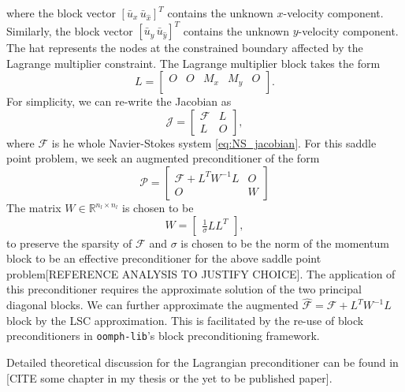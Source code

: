 \renewcommand{\arraystretch}{1}
where the block vector $[\bar{u}_x \, \bar{u}_{\hat{x}}]^T$ contains the unknown $x$-velocity component. Similarly, the block vector
$[\bar{u}_y \, \bar{u}_{\hat{y}}]^T$ contains the unknown $y$-velocity component. The hat represents the nodes at the constrained boundary affected by the Lagrange
multiplier constraint. The Lagrange multiplier block takes the form
\begin{equation*}
	L =
\begin{bmatrix}
 O & O & M_x & M_y & O \\
\end{bmatrix}.
\end{equation*}
For simplicity, we can re-write the Jacobian as
\begin{equation*}
	\mathcal{J} = 
	\begin{bmatrix}
	 \mathcal{F} & L\\
	L & \mathit{O}
	\end{bmatrix},
\end{equation*}
where $\mathcal{F}$ is he whole Navier-Stokes system \eqref{eq:NS_jacobian}.
For this saddle point problem, we seek an augmented preconditioner of the form
\begin{equation*}
	\mathcal{P} = 
	\begin{bmatrix}
	 \mathcal{F}+ L^T W^{-1} L & \mathit{O}\\
	\mathit{O} & W
	\end{bmatrix}
\end{equation*}
The matrix $W\in \mathbb{R}^{n_l \times n_l}$ is chosen to be
 \begin{equation}
 	W = 
 	\begin{bmatrix}
 	\frac{1}{\sigma}L L^T
 	\end{bmatrix},
 	\label{eq:W}
 \end{equation}
to preserve the sparsity of $\mathcal{F}$ and $\sigma$ is chosen to be the norm
of the momentum block to be an effective preconditioner for the above saddle
point problem[REFERENCE ANALYSIS TO JUSTIFY CHOICE]. The application of this preconditioner requires the approximate solution of the
two principal diagonal blocks. We can further approximate the augmented
$\hat{\mathcal{F}} = \mathcal{F} + L^TW^{-1}L$ block by the LSC approximation.
This is facilitated by the re-use of block preconditioners in
\texttt{oomph-\allowbreak lib}'s block preconditioning framework.

Detailed theoretical discussion for the Lagrangian preconditioner can be found in [CITE some chapter in my thesis or the yet to be published paper].
